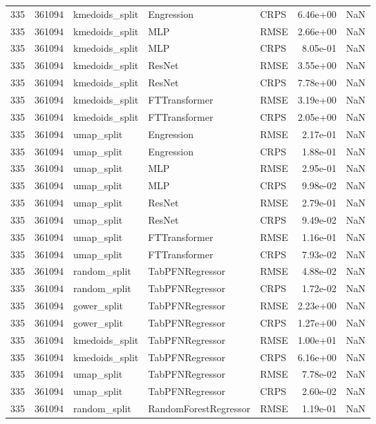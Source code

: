 \begin{tabular}{rrlllrr}
335 & 361094 & kmedoids\_split & Engression & CRPS & 6.46e+00 & NaN \\
335 & 361094 & kmedoids\_split & MLP & RMSE & 2.66e+00 & NaN \\
335 & 361094 & kmedoids\_split & MLP & CRPS & 8.05e-01 & NaN \\
335 & 361094 & kmedoids\_split & ResNet & RMSE & 3.55e+00 & NaN \\
335 & 361094 & kmedoids\_split & ResNet & CRPS & 7.78e+00 & NaN \\
335 & 361094 & kmedoids\_split & FTTransformer & RMSE & 3.19e+00 & NaN \\
335 & 361094 & kmedoids\_split & FTTransformer & CRPS & 2.05e+00 & NaN \\
335 & 361094 & umap\_split & Engression & RMSE & 2.17e-01 & NaN \\
335 & 361094 & umap\_split & Engression & CRPS & 1.88e-01 & NaN \\
335 & 361094 & umap\_split & MLP & RMSE & 2.95e-01 & NaN \\
335 & 361094 & umap\_split & MLP & CRPS & 9.98e-02 & NaN \\
335 & 361094 & umap\_split & ResNet & RMSE & 2.79e-01 & NaN \\
335 & 361094 & umap\_split & ResNet & CRPS & 9.49e-02 & NaN \\
335 & 361094 & umap\_split & FTTransformer & RMSE & 1.16e-01 & NaN \\
335 & 361094 & umap\_split & FTTransformer & CRPS & 7.93e-02 & NaN \\
335 & 361094 & random\_split & TabPFNRegressor & RMSE & 4.88e-02 & NaN \\
335 & 361094 & random\_split & TabPFNRegressor & CRPS & 1.72e-02 & NaN \\
335 & 361094 & gower\_split & TabPFNRegressor & RMSE & 2.23e+00 & NaN \\
335 & 361094 & gower\_split & TabPFNRegressor & CRPS & 1.27e+00 & NaN \\
335 & 361094 & kmedoids\_split & TabPFNRegressor & RMSE & 1.00e+01 & NaN \\
335 & 361094 & kmedoids\_split & TabPFNRegressor & CRPS & 6.16e+00 & NaN \\
335 & 361094 & umap\_split & TabPFNRegressor & RMSE & 7.78e-02 & NaN \\
335 & 361094 & umap\_split & TabPFNRegressor & CRPS & 2.60e-02 & NaN \\
335 & 361094 & random\_split & RandomForestRegressor & RMSE & 1.19e-01 & NaN \\

\end{tabular}
